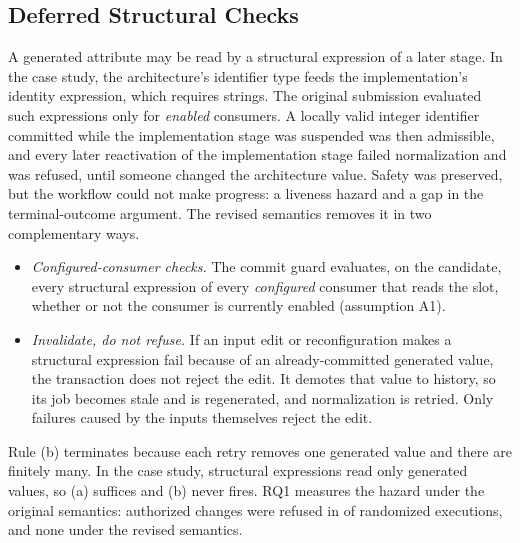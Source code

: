\subsection{Deferred Structural Checks}\label{sec:deferred}
A generated attribute may be read by a structural expression of a later stage. In the case study, the architecture's identifier type feeds the implementation's identity expression, which requires strings. The original submission evaluated such expressions only for \emph{enabled} consumers. A locally valid integer identifier committed while the implementation stage was suspended was then admissible, and every later reactivation of the implementation stage failed normalization and was refused, until someone changed the architecture value. Safety was preserved, but the workflow could not make progress: a liveness hazard and a gap in the terminal-outcome argument. The revised semantics removes it in two complementary ways.
\begin{itemize}
\item[\textbf{(a)}] \emph{Configured-consumer checks.} The commit guard evaluates, on the candidate, every structural expression of every \emph{configured} consumer that reads the slot, whether or not the consumer is currently enabled (assumption A1).
\item[\textbf{(b)}] \emph{Invalidate, do not refuse.} If an input edit or reconfiguration makes a structural expression fail because of an already-committed generated value, the transaction does not reject the edit. It demotes that value to history, so its job becomes stale and is regenerated, and normalization is retried. Only failures caused by the inputs themselves reject the edit.
\end{itemize}
Rule (b) terminates because each retry removes one generated value and there are finitely many. In the case study, structural expressions read only generated values, so (a) suffices and (b) never fires. RQ1 measures the hazard under the original semantics: \EnabledOnlyRefusals{} authorized changes were refused in \EnabledOnlyRuns{} of \AblRuns{} randomized executions, and none under the revised semantics.

